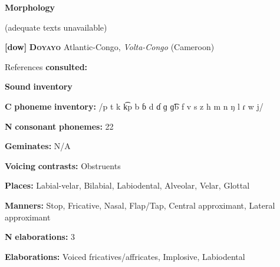 \documentclass[output=paper]{langsci/langscibook}
\begin{document}
\begin{styleBody}
\textbf{Morphology}
\end{styleBody}

\begin{styleBody}
(adequate texts unavailable)
\end{styleBody}

\begin{styleBody}
\textbf{[dow]}   \textbf{\textsc{Doyayo}}    Atlantic-Congo, \textit{Volta-Congo} (Cameroon)
\end{styleBody}

\begin{styleBody}
References \textbf{consulted:} \citet{WieringWiering1994}
\end{styleBody}

\begin{styleBody}
\textbf{Sound} \textbf{inventory}
\end{styleBody}

\begin{styleBody}
\textbf{C} \textbf{phoneme} \textbf{inventory:} /p t k k͡p b ɓ d ɗ ɡ ɡ͡b f v s z h m n ŋ l ɾ w j/
\end{styleBody}

\begin{styleBody}
\textbf{N} \textbf{consonant} \textbf{phonemes:} 22
\end{styleBody}

\begin{styleBody}
\textbf{Geminates:} N/A
\end{styleBody}

\begin{styleBody}
\textbf{Voicing} \textbf{contrasts:} Obstruents
\end{styleBody}

\begin{styleBody}
\textbf{Places:} Labial-velar, Bilabial, Labiodental, Alveolar, Velar, Glottal
\end{styleBody}

\begin{styleBody}
\textbf{Manners:} Stop, Fricative, Nasal, Flap/Tap, Central approximant, Lateral approximant
\end{styleBody}

\begin{styleBody}
\textbf{N} \textbf{elaborations:} 3
\end{styleBody}

\begin{styleBody}
\textbf{Elaborations:} Voiced fricatives/affricates, Implosive, Labiodental
\end{styleBody}
\end{document}
